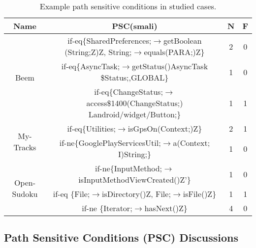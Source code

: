 \begin{table}[!t]
\centering
\begin{threeparttable}[b]
\caption{Example path sensitive conditions in studied cases. } 
\newcommand{\tabincell}[2]{\begin{tabular}{@{}#1@{}}#2\end{tabular}}
\footnotesize

\begin{tabular}{|c|c|c|c|}
\hline 
Name &  PSC(smali) & N & F\\
\hline 
\hline 
\multirow{6}{0.8cm}{Beem }& \multirow{2}{5.8cm}{if-eq\{SharedPreferences;$\rightarrow$getBoolean (String;Z)Z, 
String;$\rightarrow$equals(PARA;)Z\} } & \multirow{2}{*}{2}  & \multirow{2}{*}{0}\\
&&&\\
\cline{2-4}
 & \multirow{2}{5.8cm}{if-eq\{AsyncTask;$\rightarrow$getStatus()AsyncTask \$Status;,GLOBAL\}}  &\multirow{2}{*}{1} & \multirow{2}{*}{0}\\

&&&\\
 \cline{2-4}
  & \multirow{2}{5.8cm}{if-eq\{ChangeStatus;$\rightarrow$access\$1400(ChangeStatus;) Landroid/widget/Button;\}} &\multirow{2}{*}{1} & \multirow{2}{*}{1}\\
  &&&\\
\hline 
\multirow{2}{0.8cm}{My- Tracks}  &if-eq\{Utilities;$\rightarrow$isGpsOn(Context;)Z\} & 2 &1\\
\cline{2-4} 
 &if-ne\{GooglePlayServicesUtil;$\rightarrow$a(Context; I)String;\} & 1 & 0\\
\hline 
\multirow{3}{0.8cm}{Open- Sudoku}  & if-ne\{InputMethod;$\rightarrow$isInputMethodViewCreated()Z'\}  & 1&  0\\
\cline{2-4}
 & if-eq \{File;$\rightarrow$isDirectory()Z, File;$\rightarrow$isFile()Z\} &1&  1\\
\cline{2-4}
   & if-ne \{Iterator;$\rightarrow$hasNext()Z\}& 4&  0\\
\hline 
\end{tabular}
\label{tb2: experiment2}  
\end{threeparttable}
\end{table}

\subsection{Path Sensitive Conditions (PSC) Discussions}

